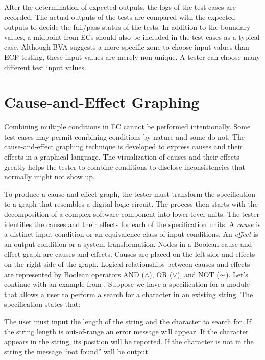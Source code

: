 After the determination of expected outputs, the logs of the test cases are recorded. The actual outputs of the tests are compared with the expected outputs to decide the fail/pass status of the tests. In addition to the boundary values, a midpoint from ECs should also be included in the test cases as a typical case. Although BVA suggests a more specific zone to choose input values than ECP testing, these input values are merely non-unique. A tester can choose many different test input values.

\section{Cause-and-Effect Graphing}
Combining multiple conditions in EC cannot be performed intentionally. Some test cases may permit combining conditions by nature and some do not. The cause-and-effect graphing technique is developed to express causes and their effects in a graphical language. The visualization of causes and their effects greatly helps the tester to combine conditions to disclose inconsistencies that normally might not show up.

To produce a cause-and-effect graph, the tester must transform the specification to a graph that resembles a digital logic circuit. The process then starts with the decomposition of a complex software component into lower-level units. The tester identifies the causes and their effects for each of the specification units. A \emph{cause} is a distinct input condition or an equivalence class of input conditions. An \emph{effect} is an output condition or a system transformation. Nodes in a Boolean cause-and-effect graph are causes and effects. Causes are placed on the left side and effects on the right side of the graph. Logical relationships between causes and effects are represented by Boolean operators AND ($\land$), OR ($\lor$), and NOT ($\thicksim$). Let's continue with an example from \autocite{burnstein2006practical}. Suppose we have a specification for a module that allows a user to perform a search for a character in an existing string. The specification states that:

\begin{displayquote}
    The user must input the length of the string and the character to search for. If the string length is out-of-range an error message will appear. If the character appears in the string, its position will be reported. If the character is not in the string the message “not found” will be output.
\end{displayquote}

